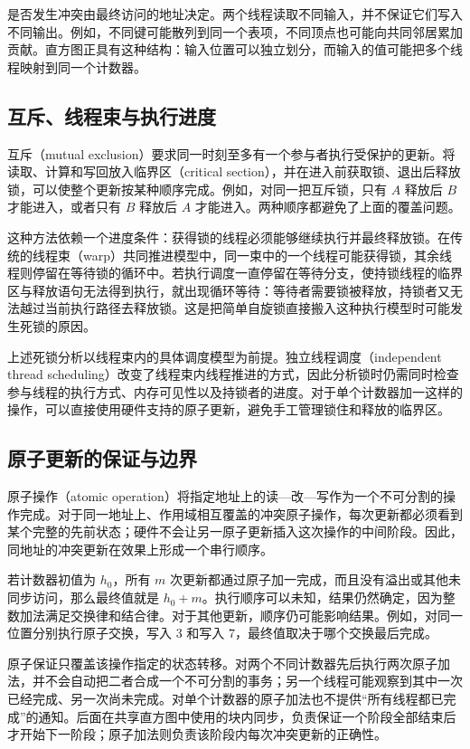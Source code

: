 是否发生冲突由最终访问的地址决定。两个线程读取不同输入，并不保证它们写入不同输出。例如，不同键可能散列到同一个表项，不同顶点也可能向共同邻居累加贡献。直方图正具有这种结构：输入位置可以独立划分，而输入的值可能把多个线程映射到同一个计数器。

\subsection{互斥、线程束与执行进度}

互斥（mutual exclusion）要求同一时刻至多有一个参与者执行受保护的更新。将读取、计算和写回放入临界区（critical section），并在进入前获取锁、退出后释放锁，可以使整个更新按某种顺序完成。例如，对同一把互斥锁，只有 $A$ 释放后 $B$ 才能进入，或者只有 $B$ 释放后 $A$ 才能进入。两种顺序都避免了上面的覆盖问题。

这种方法依赖一个进度条件：获得锁的线程必须能够继续执行并最终释放锁。在传统的线程束（warp）共同推进模型中，同一束中的一个线程可能获得锁，其余线程则停留在等待锁的循环中。若执行调度一直停留在等待分支，使持锁线程的临界区与释放语句无法得到执行，就出现循环等待：等待者需要锁被释放，持锁者又无法越过当前执行路径去释放锁。这是把简单自旋锁直接搬入这种执行模型时可能发生死锁的原因。

上述死锁分析以线程束内的具体调度模型为前提。独立线程调度（independent thread scheduling）改变了线程束内线程推进的方式，因此分析锁时仍需同时检查参与线程的执行方式、内存可见性以及持锁者的进度。对于单个计数器加一这样的操作，可以直接使用硬件支持的原子更新，避免手工管理锁住和释放的临界区。

\subsection{原子更新的保证与边界}

原子操作（atomic operation）将指定地址上的读—改—写作为一个不可分割的操作完成。对于同一地址上、作用域相互覆盖的冲突原子操作，每次更新都必须看到某个完整的先前状态；硬件不会让另一原子更新插入这次操作的中间阶段。因此，同地址的冲突更新在效果上形成一个串行顺序。

若计数器初值为 $h_0$，所有 $m$ 次更新都通过原子加一完成，而且没有溢出或其他未同步访问，那么最终值就是 $h_0+m$。执行顺序可以未知，结果仍然确定，因为整数加法满足交换律和结合律。对于其他更新，顺序仍可能影响结果。例如，对同一位置分别执行原子交换，写入 $3$ 和写入 $7$，最终值取决于哪个交换最后完成。

原子保证只覆盖该操作指定的状态转移。对两个不同计数器先后执行两次原子加法，并不会自动把二者合成一个不可分割的事务；另一个线程可能观察到其中一次已经完成、另一次尚未完成。对单个计数器的原子加法也不提供“所有线程都已完成”的通知。后面在共享直方图中使用的块内同步，负责保证一个阶段全部结束后才开始下一阶段；原子加法则负责该阶段内每次冲突更新的正确性。

